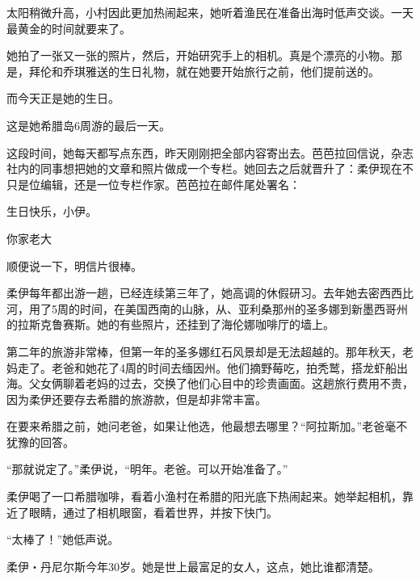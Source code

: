 太阳稍微升高，小村因此更加热闹起来，她听着渔民在准备出海时低声交谈。一天最黄金的时间就要来了。

她拍了一张又一张的照片，然后，开始研究手上的相机。真是个漂亮的小物。那是，拜伦和乔琪雅送的生日礼物，就在她要开始旅行之前，他们提前送的。

而今天正是她的生日。

这是她希腊岛6周游的最后一天。

这段时间，她每天都写点东西，昨天刚刚把全部内容寄出去。芭芭拉回信说，杂志社内的同事想把她的文章和照片做成一个专栏。她回去之后就晋升了：柔伊现在不只是位编辑，还是一位专栏作家。芭芭拉在邮件尾处署名：

{\kaishu 生日快乐，小伊。}

{\kaishu 你家老大}

{\kaishu 顺便说一下，明信片很棒。}

柔伊每年都出游一趟，已经连续第三年了，她高调的休假研习。去年她去密西西比河，用了5周的时间，在美国西南的山脉，从、亚利桑那州的圣多娜到新墨西哥州的拉斯克鲁赛斯。她的有些照片，还挂到了海伦娜咖啡厅的墙上。

第二年的旅游非常棒，但第一年的圣多娜红石风景却是无法超越的。那年秋天，老妈走了。老爸和她花了4周的时间去缅因州。他们摘野莓吃，拍秃鹫，搭龙虾船出海。父女俩聊着老妈的过去，交换了他们心目中的珍贵画面。这趟旅行费用不贵，因为柔伊还要存去希腊的旅游款，但是却非常丰富。

在要来希腊之前，她问老爸，如果让他选，他最想去哪里？“阿拉斯加。”老爸毫不犹豫的回答。

“那就说定了。”柔伊说，“明年。老爸。可以开始准备了。”

柔伊喝了一口希腊咖啡，看着小渔村在希腊的阳光底下热闹起来。她举起相机，靠近了眼睛，通过了相机眼窗，看着世界，并按下快门。

“太棒了！”她低声说。

柔伊‧丹尼尔斯今年30岁。她是世上最富足的女人，这点，她比谁都清楚。
